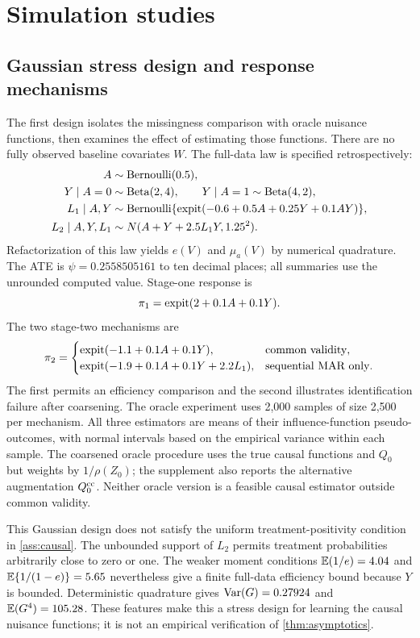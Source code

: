\section{Simulation studies}\label{sec:sim}

\subsection{Gaussian stress design and response mechanisms}

The first design isolates the missingness comparison with oracle nuisance functions, then examines the effect of estimating those functions. There are no fully observed baseline covariates $W$. The full-data law is specified retrospectively:
\begin{align*}
A&\sim\mathrm{Bernoulli}(0.5),\\
Y\mid A=0&\sim\mathrm{Beta}(2,4),\qquad
Y\mid A=1\sim\mathrm{Beta}(4,2),\\
L_1\mid A,Y&\sim\mathrm{Bernoulli}\{\operatorname{expit}(-0.6+0.5A+0.25Y+0.1AY)\},\\
L_2\mid A,Y,L_1&\sim N(A+Y+2.5L_1Y,1.25^2).
\end{align*}
Refactorization of this law yields $e(V)$ and $\mu_a(V)$ by numerical quadrature. The ATE is $\psi=0.2558505161$ to ten decimal places; all summaries use the unrounded computed value. Stage-one response is
\[
\pi_1=\operatorname{expit}(2+0.1A+0.1Y).
\]
The two stage-two mechanisms are
\[
\pi_2=\begin{cases}
\operatorname{expit}(-1.1+0.1A+0.1Y),&\text{common validity},\\
\operatorname{expit}(-1.9+0.1A+0.1Y+2.2L_1),&\text{sequential MAR only}.
\end{cases}
\]
The first permits an efficiency comparison and the second illustrates identification failure after coarsening. The oracle experiment uses 2,000 samples of size 2,500 per mechanism. All three estimators are means of their influence-function pseudo-outcomes, with normal intervals based on the empirical variance within each sample. The coarsened oracle procedure uses the true causal functions and $Q_0$ but weights by $1/\rho(Z_0)$; the supplement also reports the alternative augmentation $Q_0^{\mathrm{cc}}$. Neither oracle version is a feasible causal estimator outside common validity.

This Gaussian design does not satisfy the uniform treatment-positivity condition in \cref{ass:causal}. The unbounded support of $L_2$ permits treatment probabilities arbitrarily close to zero or one. The weaker moment conditions $\mathbb{E}(1/e)=4.04$ and $\mathbb{E}\{1/(1-e)\}=5.65$ nevertheless give a finite full-data efficiency bound because $Y$ is bounded. Deterministic quadrature gives $\operatorname{Var}(G)=0.27924$ and $\mathbb{E}(G^4)=105.28$. These features make this a stress design for learning the causal nuisance functions; it is not an empirical verification of \cref{thm:asymptotics}.


